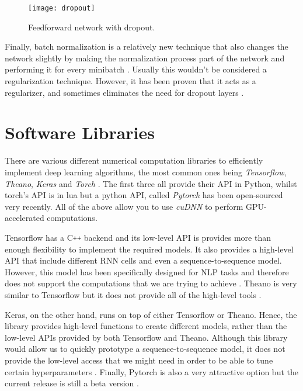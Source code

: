 \begin{figure}[ht]
  \centering
  \texttt{[image: dropout]}
  \caption{Feedforward network with dropout.}
  \label{fig:dropout}
\end{figure}


Finally, batch normalization is a relatively new technique that also changes the network slightly by making the normalization process part of the network and performing it for every minibatch \cite{ioffe2015batch}.
Usually this wouldn't be considered a regularization technique.
However, it has been proven that it acts as a regularizer, and sometimes eliminates the need for dropout layers \cite{ioffe2015batch}.

\newpage

\section{Software Libraries}

There are various different numerical computation libraries to efficiently implement deep learning algorithms,
the most common ones being \textit{Tensorflow}, \textit{Theano}, \textit{Keras} and \textit{Torch} \cite{tensorflow,theano,keras,torch}.
The first three all provide their API in Python, whilst torch's API is in lua but a python API, called \textit{Pytorch} has been open-sourced very recently.
All of the above allow you to use \textit{cuDNN} to perform GPU-accelerated computations.

Tensorflow has a C\texttt{++} backend and its low-level API is provides more than enough flexibility to implement the required models.
It also provides a high-level API that include different RNN cells and even a sequence-to-sequence model.
However, this model has been specifically designed for NLP tasks and therefore does not support the computations that we are trying to achieve \cite{tensorflow}.
Theano is very similar to Tensorflow but it does not provide all of the high-level tools \cite{theano}.

Keras, on the other hand, runs on top of either Tensorflow or Theano.
Hence, the library provides high-level functions to create different models, rather than the low-level APIs provided by both Tensorflow and Theano.
Although this library would allow us to quickly prototype a sequence-to-sequence model, it does not provide the low-level access that we might need in order to be able to tune certain hyperparameters \cite{keras}.
Finally, Pytorch is also a very attractive option but the current release is still a beta version \cite{torch}.

